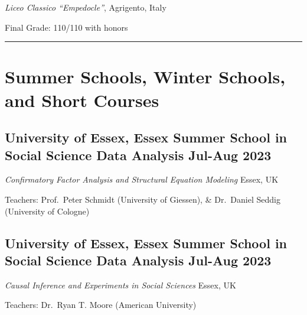 \documentclass[8pt,]{article}
\providecommand{\tightlist}{%
  \setlength{\itemsep}{0pt}\setlength{\parskip}{0pt}}
\renewenvironment{itemize}{
  \begin{list}{}{
    \setlength{\leftmargin}{1.5em}
  }
}{
  \end{list}
}
\begin{document}
\begin{itemize}
\item
  \emph{Liceo Classico ``Empedocle''}, Agrigento, Italy
\item
  Final Grade: 110/110 with honors

  \bigskip \hrule
\end{itemize}

\hypertarget{summer-schools-winter-schools-and-short-courses}{%
\section{Summer Schools, Winter Schools, and Short
Courses}\label{summer-schools-winter-schools-and-short-courses}}

\hypertarget{university-of-essex-essex-summer-school-in-social-science-data-analysis-jul-aug-2023}{%
\subsection{\texorpdfstring{University of Essex, Essex Summer School in
Social Science Data Analysis \hfill  Jul-Aug
2023}{University of Essex, Essex Summer School in Social Science Data Analysis Jul-Aug 2023}}\label{university-of-essex-essex-summer-school-in-social-science-data-analysis-jul-aug-2023}}

\begin{itemize}
\tightlist
\item
  \emph{Confirmatory Factor Analysis and Structural Equation Modeling}
  \hfill Essex, UK
\item
  Teachers: Prof.~Peter Schmidt (University of Giessen), \& Dr.~Daniel
  Seddig (University of Cologne)
\end{itemize}

\hypertarget{university-of-essex-essex-summer-school-in-social-science-data-analysis-jul-aug-2023-1}{%
\subsection{\texorpdfstring{University of Essex, Essex Summer School in
Social Science Data Analysis \hfill  Jul-Aug
2023}{University of Essex, Essex Summer School in Social Science Data Analysis Jul-Aug 2023}}\label{university-of-essex-essex-summer-school-in-social-science-data-analysis-jul-aug-2023-1}}

\begin{itemize}
\tightlist
\item
  \emph{Causal Inference and Experiments in Social Sciences}
  \hfill Essex, UK
\item
  Teachers: Dr.~Ryan T. Moore (American University)
\end{itemize}
\end{document}

